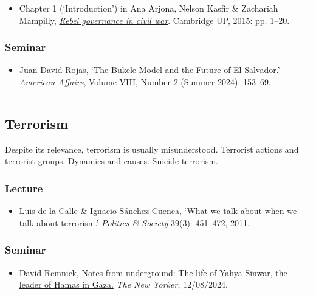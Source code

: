 \documentclass[12pt, a4paper]{article}
\begin{document}
\begin{itemize}
\setlength\itemsep{0pt}
\item Chapter 1 (`Introduction') in Ana Arjona, Nelson Kasfir \& Zachariah Mampilly, \href{https://doi.org/10.1017/CBO9781316182468}{\textit{Rebel governance in civil war}}. Cambridge UP, 2015: pp. 1--20.
\end{itemize}

\subsubsection*{Seminar}

\begin{itemize}
\setlength\itemsep{-5pt}
\item Juan David Rojas, `\href{https://americanaffairsjournal.org/2024/05/the-bukele-model-and-the-future-of-el-salvador/}{The Bukele Model and the Future of El Salvador}.' \textit{American Affairs}, Volume VIII, Number 2 (Summer 2024): 153–69.
\end{itemize}

\hrule %

\subsection{Terrorism}

Despite its relevance, terrorism is usually misunderstood. Terrorist actions and terrorist groups. Dynamics and causes. Suicide terrorism.

\subsubsection*{Lecture}

\begin{itemize}
\setlength\itemsep{0pt}
\item Luis de la Calle \& Ignacio Sánchez-Cuenca, `\href{https://doi.org/10.1177/0032329211415506}{What we talk about when we talk about terrorism}.' \textit{Politics \& Society} 39(3): 451--472, 2011.
\end{itemize}

\subsubsection*{Seminar}

\begin{itemize}
\setlength\itemsep{0pt}
\item David Remnick, \href{https://www.newyorker.com/magazine/2024/08/12/yahya-sinwar-profile-hamas-gaza-war-israel}{Notes from underground: The life of Yahya Sinwar, the leader of Hamas in Gaza.} \textit{The New Yorker}, 12/08/2024.
\end{itemize}
\end{document}
